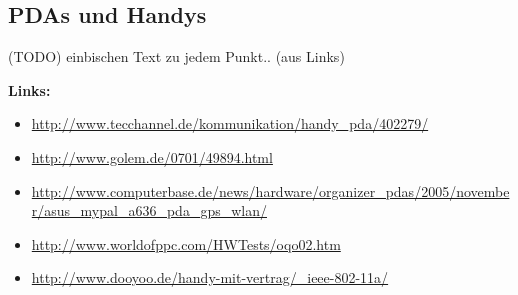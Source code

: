 \subsection{PDAs und Handys}

(TODO) einbischen Text zu jedem Punkt.. (aus Links)

\textbf{Links:}

\begin{itemize}	
	\item \url{http://www.tecchannel.de/kommunikation/handy_pda/402279/}
	\item \url{http://www.golem.de/0701/49894.html}
	\item \url{http://www.computerbase.de/news/hardware/organizer_pdas/2005/november/asus_mypal_a636_pda_gps_wlan/}
	\item \url{http://www.worldofppc.com/HWTests/oqo02.htm}
	\item \url{http://www.dooyoo.de/handy-mit-vertrag/_ieee-802-11a/}
\end{itemize}
